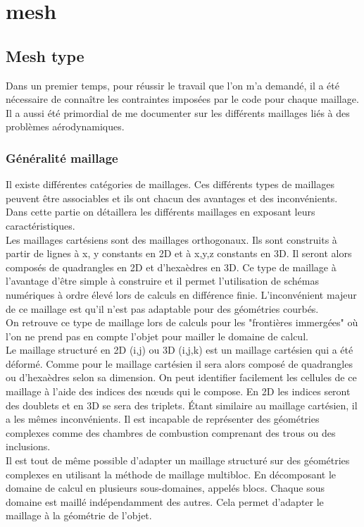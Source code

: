 \section{mesh}

\subsection{Mesh type}

Dans un premier temps, pour réussir le travail que l’on m’a demandé, il a été nécessaire de connaître les contraintes imposées par le code pour chaque maillage.\\
Il a aussi été primordial de me documenter sur les différents maillages liés à des problèmes aérodynamiques.


\subsubsection{Généralité maillage}

Il existe différentes catégories de maillages. Ces différents types de maillages peuvent être associables et ils ont chacun des avantages et des inconvénients. Dans cette partie on détaillera les différents maillages en exposant leurs caractéristiques.\\

Les maillages cartésiens sont des maillages orthogonaux. Ils sont construits à partir de lignes à x, y constants en 2D et à x,y,z constants en 3D. Il seront alors composés de quadrangles en 2D et d'hexaèdres en 3D. Ce type de maillage à l'avantage d'être simple à construire et il permet l'utilisation de schémas numériques à ordre élevé lors de calculs en différence finie. L'inconvénient majeur de ce maillage est qu'il n'est pas adaptable pour des géométries courbés.\\
On retrouve ce type de maillage lors de calculs pour les "frontières immergées" où l'on ne prend pas en compte l'objet pour mailler le domaine de calcul.\\

Le maillage structuré en 2D (i,j) ou 3D (i,j,k) est un maillage cartésien qui a été déformé. Comme pour le maillage cartésien il sera alors composé de quadrangles ou d'hexaèdres selon sa dimension. On peut identifier facilement les cellules de ce maillage à l'aide des indices des nœuds qui le compose. En 2D les indices seront des doublets et en 3D se sera des triplets.
Étant similaire au maillage cartésien, il a les mêmes inconvénients. Il est incapable de représenter des géométries complexes comme des chambres de combustion comprenant des trous ou des inclusions.\\
Il est tout de même possible d'adapter un maillage structuré sur des géométries complexes en utilisant la méthode de maillage multibloc. En décomposant le domaine de calcul en plusieurs sous-domaines, appelés blocs. Chaque sous domaine est maillé indépendamment des autres. Cela permet d'adapter le maillage à la géométrie de l'objet.\\

